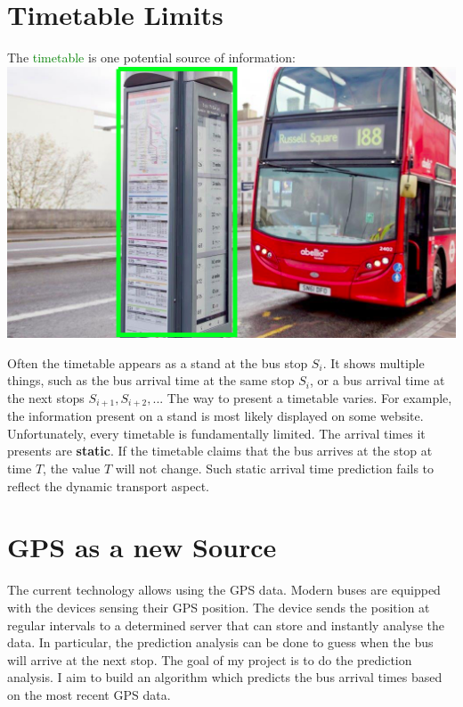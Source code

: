 \documentclass[12pt,a4paper,oneside,openright]{report}
\begin{document}
\section{Timetable Limits}

The \textcolor{green}{timetable} is one potential source of information: \\

\includegraphics[width=\textwidth]{figs/timetable_uk.png}

Often the timetable appears as a stand at the bus stop $S_i$. It shows multiple
things, such as the bus arrival time at the same stop $S_i$, or a bus arrival time
at the next stops $S_{i+1}, S_{i+2}, ...$ The way to present a timetable varies.
For example, the information present on a stand is most likely displayed on some website. \\

Unfortunately, every timetable is fundamentally limited. The arrival times it presents
are \textbf{static}. If the timetable claims that the bus arrives at the stop at
time $T$, the value $T$ will not change. Such static arrival time prediction fails to
reflect the dynamic transport aspect. \\

\section{GPS as a new Source}

The current technology allows using the GPS data. Modern buses are equipped
with the devices sensing their GPS position. The device sends the position at regular
intervals to a determined server that can store and instantly analyse the data. In
particular, the prediction analysis can be done to guess when the bus will arrive at
the next stop. The goal of my project is to do the prediction analysis. I aim to build an
algorithm which predicts the bus arrival times based on the most recent GPS data.
\end{document}

